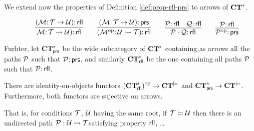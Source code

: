 We extend now the properties of Definition \ref{def:prop-rfl-prs} to arrows of $\mathbf{CT}^*$.

\begin{definition}
    $$
    \qquad \infer{\cM \of \cT \leadsto \cU)\of \rfl}{(\cM \of \cT \to \cU)\of \rfl} 
    \qquad \infer{(\op{\cM} \of \cU \leadsto \cT)\of \rfl}{(\cM \of \cT \to \cU)\of \prs}
    \qquad \infer{\cP\cdot\cQ\of \rfl}{\cP\of \rfl & \cQ \of \rfl} 
    \qquad \infer{\op{\cP} \of \prs}{\cP\of \rfl} $$

Furhter, let $\mathbf{CT}^*_{{\mathsf{prs}}}$ be the wide subcategory of $\mathbf{CT}^*$ containing as arrows all the paths ${\mathcal{P}}$ such that  ${\mathcal{P}} {:}\, {\mathsf{prs}}$, and similarly $\mathbf{CT}^*_{{\mathsf{rfl}}}$ be the one containing all paths ${\mathcal{P}}$ such that  ${\mathcal{P}} {:}\, {\mathsf{rfl}}$.

\end{definition}

\begin{theorem}
    There are identity-on-objects functors  ${(\mathbf{CT}^*_{{\mathsf{rfl}}})}^{\mathrm{op}} \rightarrow \mathbf{CT}^{\models}$ and $\mathbf{CT}^*_{{\mathsf{prs}}} \rightarrow \mathbf{CT}^{\models}$. Furthermore, both functors are sujective on arrows. 

    That is, for conditions ${\mathcal{T}}$, ${\mathcal{U}}$ having the same root, if ${\mathcal{T}} \models {\mathcal{U}}$ then there is an undirected path ${\mathcal{P}}:{\mathcal{U}} \leadsto {\mathcal{T}} $satisfying property ${\mathsf{rfl}}$, \dots
\end{theorem}



